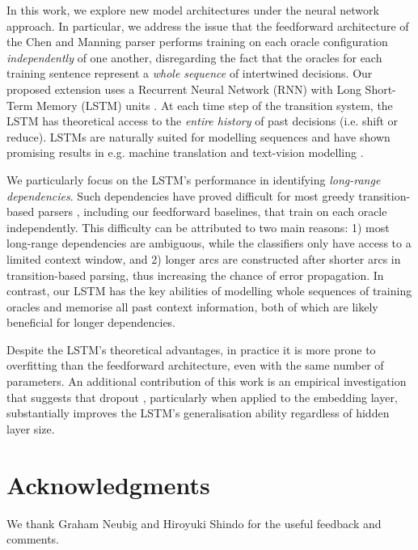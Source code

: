 \documentclass[11pt,a4paper]{article}
\begin{document}
In this work, we explore new model architectures under the neural network approach. In particular, we address the issue that the feedforward architecture of the Chen and Manning parser performs training on each oracle configuration \textit{independently} of one another, disregarding the fact that the oracles for each training sentence represent a \textit{whole sequence} of intertwined decisions. Our proposed extension uses a Recurrent Neural Network (RNN) with Long Short-Term Memory (LSTM) units \cite{HS97}. At each time step of the transition system, the LSTM has theoretical access to the \textit{entire history} of past decisions (i.e. shift or reduce). LSTMs are naturally suited for modelling sequences and have shown promising results in e.g. machine translation \cite{Set14} and text-vision modelling \cite{Vet141}.

\par We particularly focus on the LSTM's performance in identifying \textit{long-range dependencies}. Such dependencies have proved difficult for most greedy transition-based parsers \cite{MN07}, including our feedforward baselines, that train on each oracle independently. This difficulty can be attributed to two main reasons: 1) most long-range dependencies are ambiguous, while the classifiers only have access to a limited context window, and 2) longer arcs are constructed after shorter arcs in transition-based parsing, thus increasing the chance of error propagation. In contrast, our LSTM has the key abilities of modelling  whole sequences of training oracles and memorise all past context information, both of which are likely beneficial for longer dependencies.

\par Despite the LSTM's theoretical advantages, in practice it is more prone to overfitting than the feedforward architecture, even with the same number of parameters. An additional contribution of this work is an empirical investigation that suggests that dropout \cite{Set142}, particularly when applied to the embedding layer, substantially improves the LSTM's generalisation ability regardless of hidden layer size. %











\section*{Acknowledgments}

We thank Graham Neubig and Hiroyuki Shindo for the useful feedback and comments.  



\nocite{*}
\newpage


\end{document}
